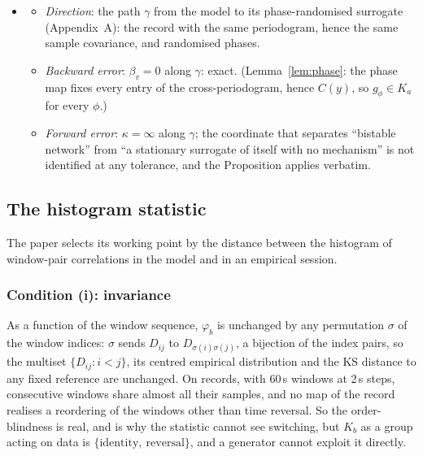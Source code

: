 \documentclass[11pt]{article}
\begin{document}
\begin{itemize}
\begin{itemize}
  \item \emph{Forward error}: $\kappa$ large along $r$; the regime, and the linear-against-nonlinear distinction with it, is not identified by $\varphi_a$ at the field's own criteria.
  \end{itemize}
\item[$\Theta_3$]
  \begin{itemize}
  \item \emph{Direction}: the path $\gamma$ from the model to its phase-randomised surrogate (Appendix~A): the record with the same periodogram, hence the same sample covariance, and randomised phases.
  \item \emph{Backward error}: $\beta_v=0$ along $\gamma$: exact. (Lemma~\ref{lem:phase}: the phase map fixes every entry of the cross-periodogram, hence $C(y)$, so $g_\phi\in K_a$ for every $\phi$.)
  \item \emph{Forward error}: $\kappa=\infty$ along $\gamma$; the coordinate that separates ``bistable network'' from ``a stationary surrogate of itself with no mechanism'' is not identified at any tolerance, and the Proposition applies verbatim.
  \end{itemize}
\end{itemize}

\subsection{The histogram statistic}\label{app:hist}
The paper selects its working point by the distance between the histogram of window-pair correlations in the model and in an empirical session.
\subsubsection{Condition (i): invariance}
As a function of the window sequence, $\varphi_b$ is unchanged by any permutation $\sigma$ of the window indices: $\sigma$ sends $D_{ij}$ to $D_{\sigma(i)\sigma(j)}$, a bijection of the index pairs, so the multiset $\{D_{ij}: i<j\}$, its centred empirical distribution and the KS distance to any fixed reference are unchanged. On records, with 60\,s windows at 2\,s steps, consecutive windows share almost all their samples, and no map of the record realises a reordering of the windows other than time reversal. So the order-blindness is real, and is why the statistic cannot see switching, but $K_b$ as a group acting on data is $\{\text{identity},\ \text{reversal}\}$, and a generator cannot exploit it directly.
\end{document}
